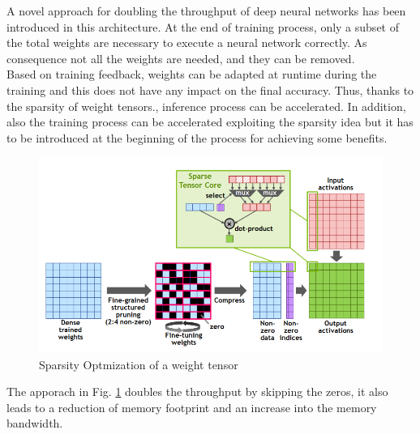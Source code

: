 A novel approach for doubling the throughput of deep neural networks has been introduced in this architecture. At the end of training process, only a subset of the total weights are necessary to execute a neural network correctly. As consequence not all the weights are needed, and they can be removed.\\
Based on training feedback, weights can be adapted at runtime during the training and this does not have any impact on the final accuracy. Thus, thanks to the sparsity of weight tensors., inference process can be accelerated. In addition, also the training process can be accelerated exploiting the sparsity idea but it has to be introduced at the beginning of the process for achieving some benefits.

\begin{figure}[!htbp]
\centering
\captionsetup{justification=centering}
\includegraphics[scale=0.4]{./figure/sparsity.png}
\caption{Sparsity Optmization of a weight tensor\cite{paper:41}}
\label{fig:spa}
\end{figure}
The apporach in Fig. \ref{fig:spa} doubles the throughput by skipping the zeros, it also leads to a reduction of memory footprint and an increase into the memory bandwidth.\\


